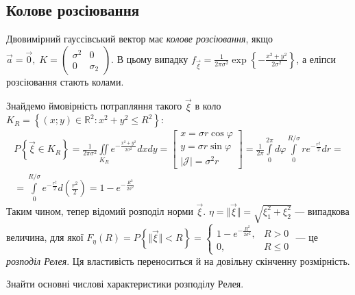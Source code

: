 \subsection{Колове розсіювання}
\begin{definition}
    Двовимірний гауссівський вектор має \emph{колове розсіювання}, якщо
    $\vec{a} = \vec{0}, \; K = \begin{pmatrix}
        \sigma^2 & 0 \\
        0 & \sigma_2
    \end{pmatrix}$. В цьому випадку $f_{\vec{\xi}} = \frac{1}{2\pi\sigma^2} \exp\left\{-\frac{x^2+y^2}{2\sigma^2}\right\}$, 
    а еліпси розсіювання стають колами.
\end{definition}
Знайдемо ймовірність потрапляння такого $\vec{\xi}$ в коло $K_R = \left\{(x; y) \in \mathbb{R}^2 : x^2 + y^2 \leq R^2\right\}$:
\begin{gather*}
    P\left\{\vec{\xi} \in K_R\right\} = \frac{1}{2\pi\sigma^2} \iint\limits_{K_R} e^{-\frac{x^2+y^2}{2\sigma^2}} dx dy = 
    \left[ \begin{gathered}
        x = \sigma r\cos\varphi \\
        y = \sigma r\sin\varphi \\
        |\mathcal{J}| = \sigma^2 r
    \end{gathered}\right] =
    \frac{1}{2\pi} \int\limits_0^{2\pi} d\varphi \int\limits_0^{R/\sigma} r e^{-\frac{r^2}{2}} dr = \\
    = \int\limits_0^{R/\sigma} e^{-\frac{r^2}{2}} d \left( \frac{r^2}{2}\right) = 
    1 - e^{-\frac{R^2}{2\sigma^2}}
\end{gather*}
Таким чином, тепер відомий розподіл норми $\vec{\xi}$. $\eta = \Vert \vec{\xi} \Vert = \sqrt{\xi_1^2 + \xi_2^2}$ --- випадкова величина,
для якої $F_{\eta}(R) = P\left\{\Vert \vec{\xi} \Vert < R\right\} = \begin{cases}
    1 - e^{-\frac{R^2}{2\sigma^2}}, & R > 0 \\
    0, & R \leq 0
\end{cases}$ --- це \emph{розподіл Релея}. Ця властивість переноситься й на довільну скінченну розмірність.

\begin{exercise}
    Знайти основні числові характеристики розподілу Релея.
\end{exercise}

